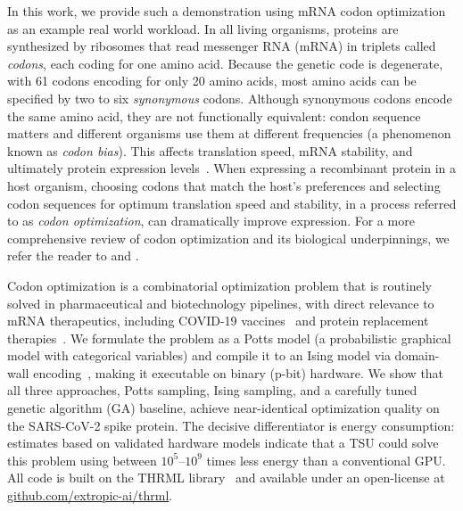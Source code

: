 \documentclass[11pt,twocolumn]{article}
\begin{document}
In this work, we provide such a demonstration using mRNA codon optimization as an example real world workload.
In all living organisms, proteins are synthesized by ribosomes that read messenger RNA (mRNA) in triplets called \emph{codons}, each coding for one amino acid. Because the genetic code is degenerate, with 61 codons encoding for only 20 amino acids, most amino acids can be specified by two to six \emph{synonymous} codons. Although synonymous codons encode the same amino acid, they are not functionally equivalent: condon sequence matters and different organisms use them at different frequencies (a phenomenon known as \emph{codon bias}). This affects translation speed, mRNA stability, and ultimately protein expression levels~\cite{gustafsson2004codon, quax2015codon, brule2017synonymous}. When expressing a recombinant protein in a host organism, choosing codons that match the host's preferences and selecting codon sequences for optimum translation speed and stability, in a process referred to as \emph{codon optimization}, can dramatically improve expression. For a more comprehensive review of codon optimization and its biological underpinnings, we refer the reader to \cite{gustafsson2004codon} and \cite{quax2015codon}.

Codon optimization is a combinatorial optimization problem that is routinely solved in pharmaceutical and biotechnology pipelines, with direct relevance to mRNA therapeutics, including COVID-19 vaccines~\cite{polack2020mrna} and protein replacement therapies~\cite{fox2021mrna}.
We formulate the problem as a Potts model (a probabilistic graphical model with categorical variables) and compile it to an Ising model via domain-wall encoding~\cite{chancellor2019dwc}, making it executable on binary (p-bit) hardware.
We show that all three approaches, Potts sampling, Ising sampling, and a carefully tuned genetic algorithm (GA) baseline, achieve near-identical optimization quality on the SARS-CoV-2 spike protein.
The decisive differentiator is energy consumption: estimates based on validated hardware models indicate that a TSU could solve this problem using between $10^5$--$10^9$ times less energy than a conventional GPU.
All code is built on the THRML library~\cite{jelincic2025dtm} and available under an open-license at \href{https://github.com/extropic-ai/thrml}{github.com/extropic-ai/thrml}.


\end{document}
